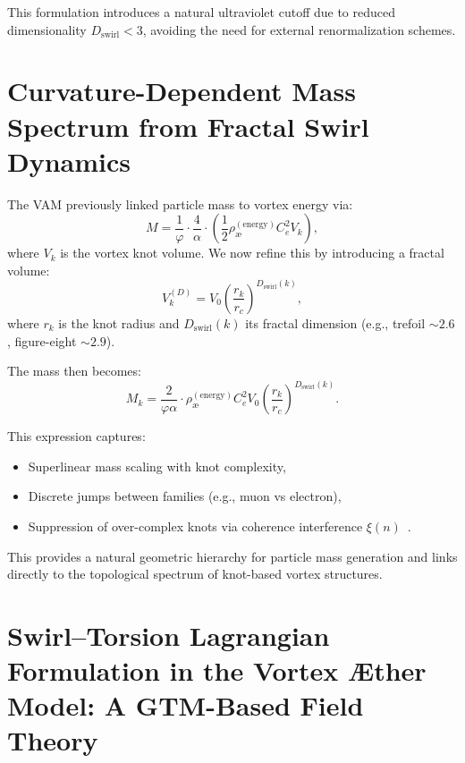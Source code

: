 \documentclass[11pt]{article}
\begin{document}
    This formulation introduces a natural ultraviolet cutoff due to reduced dimensionality \( D_\text{swirl} < 3 \), avoiding the need for external renormalization schemes.

    \section{Curvature-Dependent Mass Spectrum from Fractal Swirl Dynamics}

    The VAM previously linked particle mass to vortex energy via:
    \[
        M = \frac{1}{\varphi} \cdot \frac{4}{\alpha} \cdot \left( \frac{1}{2} \rho_\text{\ae}^{(\text{energy})} C_e^2 V_k \right),
    \]
    where \( V_k \) is the vortex knot volume. We now refine this by introducing a fractal volume:
    \[
        V_k^{(D)} = V_0 \left( \frac{r_k}{r_c} \right)^{D_\text{swirl}(k)},
    \]
    where \( r_k \) is the knot radius and \( D_\text{swirl}(k) \) its fractal dimension (e.g., trefoil \( \sim 2.6 \), figure-eight \( \sim 2.9 \)).

    The mass then becomes:
    \[
        M_k = \frac{2}{\varphi \alpha} \cdot \rho_\text{\ae}^{(\text{energy})} C_e^2 V_0 \left( \frac{r_k}{r_c} \right)^{D_\text{swirl}(k)}.
    \]

    This expression captures:
    \begin{itemize}
        \item Superlinear mass scaling with knot complexity,
        \item Discrete jumps between families (e.g., muon vs electron),
        \item Suppression of over-complex knots via coherence interference \( \xi(n) \)~\cite{vam2024mass}.
    \end{itemize}

    This provides a natural geometric hierarchy for particle mass generation and links directly to the topological spectrum of knot-based vortex structures.



    \section{\textbf{Swirl--Torsion Lagrangian Formulation in the Vortex \AE ther Model: A GTM-Based Field Theory}}
\end{document}
